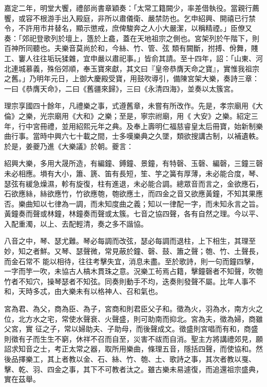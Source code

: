 \begin{pinyinscope}
 嘉定二年，明堂大饗，禮部尚書章穎奏：「太常工籍闕少，率差借執役。當親行薦饗，或容不根游手出入殿庭，非所以肅儀衛、嚴禁防也。乞申紹興、開禧已行禁令，不許用市井替名，顯示懲戒，庶俾駿奔之人小大嚴潔，以稱精禋。」臣僚又奏：「郊祀登歌列於壇上，簉於上龕，蓋在天地祖宗之側也。宮架列於午階下，則百神所同聽也。夫樂音莫尚於和，今絲、竹、管、弦
 類有闕斷，拊搏、佾舞，賤工、窶人往往垢玩猱雜，宜申嚴以肅祀事。」皆俞其請。至十四年，詔：「山東、河北連城慕義，殊俗郊順，奉玉寶來獻，其文曰『皇帝恭膺天命之寶』，實惟我祖宗之舊。」乃明年元日，上御大慶殿受寶，用鼓吹導引，備陳宮架大樂，奏詩三章：一曰《恭膺天命》，二曰《舊疆來歸》，三曰《永清四海》，並奏以太簇宮。



 理宗享國四十餘年，凡禮樂之事，式遵舊章，未嘗有所改作。先是，孝宗廟用《大倫》之樂，光宗廟用《大和》之樂；至是，寧宗祔廟，用《
 大安》之樂。紹定三年，行中宮冊禮，並用紹熙元年之典。及奉上壽明仁福慈睿皇太后冊寶，始新制樂曲行事。當時中興六七十載之間，士多嘆樂典之久墜，類欲搜講古制，以補遺軼。於是，姜夔乃進《大樂議》於朝。夔言：



 紹興大樂，多用大晟所造，有編鐘、鎛鐘、景鐘，有特磬、玉磬、編磬，三鐘三磬未必相應。塤有大小，簫、篪、笛有長短，笙、竽之簧有厚薄，未必能合度，琴、瑟弦有緩急燥濕，軫有旋復，柱有進退，未必能合調。總眾音而言之，金欲應石，
 石欲應絲，絲欲應竹，竹欲應匏，匏欲應土，而四金之音又欲應黃鐘，不知其果應否。樂曲知以七律為一調，而未知度曲之義；知以一律配一字，而未知永言之旨。黃鐘奏而聲或林鐘，林鐘奏而聲或太簇。七音之協四聲，各有自然之理。今以平、入配重濁，以上、去配輕清，奏之多不諧協。



 八音之中，琴、瑟尤難。琴必每調而改弦，瑟必每調而退柱，上下相生，其理至妙，知之者鮮。又琴、瑟聲微，常見蔽於鐘、磬、鼓、簫之聲；匏、竹、土聲長，而金石常不
 能以相待，往往考擊失宜，消息未盡。至於歌詩，則一句而鐘四擊，一字而竽一吹，未協古人槁木貫珠之意。況樂工茍焉占籍，擊鐘磬者不知聲，吹匏竹者不知穴，操琴瑟者不知弦。同奏則動手不均，迭奏則發聲不屬。比年人事不和，天時多忒，由大樂未有以格神人、召和氣也。



 宮為君、為父，商為臣、為子，宮商和則君臣父子和。徵為火，羽為水，南方火之位，北方水之宅，常使水聲衰、火聲盛，則可助南而抑北。宮為夫，徵為婦，商雖父宮，實
 征之子，常以婦助夫、子助母，而後聲成文。徵盛則宮唱而有和，商盛則徵有子而生生不窮，休祥不召而自至，災害不祓而自消。聖主方將講禮郊見，願詔求知音之士，考正太常之器，取所用樂曲，條理五音，隱括四聲，而使協和。然後品擇樂工，其上者教以金、石、絲、竹、匏、土、歌詩之事，其次者教以戛、擊、乾、羽、四金之事，其下不可教者汰之。雖古樂未易遽復，而追還祖宗盛典，實在茲舉。




\end{pinyinscope}
